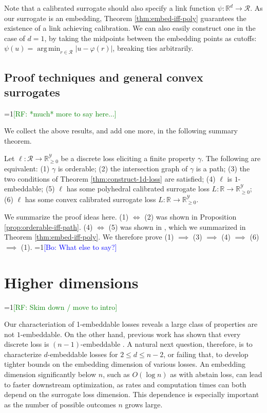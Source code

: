 \documentclass[anon]{colt2020} %
\newcommand{\Comments}{1}
\newcommand{\mynote}[2]{\ifnum\Comments=1\textcolor{#1}{#2}\fi}
\newcommand{\raf}[1]{\mynote{green}{[RF: #1]}}
\newcommand{\bo}[1]{\mynote{blue}{[Bo: #1]}}
\newcommand{\reals}{\mathbb{R}}
\newcommand{\nonnegreals}{\reals_{\geq 0}}%
\newcommand{\R}{\mathcal{R}}
\newcommand{\Y}{\mathcal{Y}}
\DeclareMathOperator*{\argmin}{arg\,min}
\begin{document}
Note that a calibrated surrogate should also specify a link function $\psi: \reals^d \to \R$.
As our surrogate is an embedding, Theorem \ref{thm:embed-iff-poly} guarantees the existence of a link achieving calibration.
We can also easily construct one in the case of $d=1$, by taking the midpoints between the embedding points as cutoffs: $\psi(u) = \argmin_{r \in \R} |u - \varphi(r)|$, breaking ties arbitrarily.

\subsection{Proof techniques and general convex surrogates}
\label{sec:1d-proof-discuss}

\raf{*much* more to say here...}

We collect the above results, and add one more, in the following summary theorem.
\begin{theorem} \label{thm:1d-tfae}
  Let $\ell: \R \to \nonnegreals^{\Y}$ be a discrete loss eliciting a finite property $\gamma$.
  The following are equivalent: (1) $\gamma$ is orderable; (2) the intersection graph of $\gamma$ is a path; (3) the two conditions of Theorem \ref{thm:construct-1d-loss} are satisfied; (4) $\ell$ is $1$-embeddable; (5) $\ell$ has some polyhedral calibrated surrogate loss $L: \reals \to \nonnegreals^{\Y}$; (6) $\ell$ has some convex calibrated surrogate loss $L: \reals \to \nonnegreals^{\Y}$.
\end{theorem}

We summarize the proof ideas here.
(1) $\iff$ (2) was shown in Proposition \ref{prop:orderable-iff-path}.
(4) $\iff$ (5) was shown in \cite{finocchiaro2019embedding}, which we summarized in Theorem \ref{thm:embed-iff-poly}.
We therefore prove (1) $\implies$ (3) $\implies$ (4) $\implies$ (6) $\implies$ (1).
\bo{What else to say?}


\section{Higher dimensions}\label{sec:d-dim}

\raf{Skim down / move to intro}

Our characteriation of 1-embeddable losses reveals a large class of properties are not $1$-embeddable.
On the other hand, previous work has shown that every discrete loss is $(n-1)$-embeddable
\citep{finocchiaro2019embedding}.
A natural next question, therefore, is to characterize $d$-embeddable losses for $2 \leq d \leq n-2$, or failing that, to develop tighter bounds on the embedding dimension of various losses.
An embedding dimension significantly below $n$, such as $O(\log n)$ as with abstain loss, can lead to faster downstream optimization, as rates and computation times can both depend on the surrogate loss dimension.
This dependence is especially important as the number of possible outcomes $n$ grows large.
\end{document}
